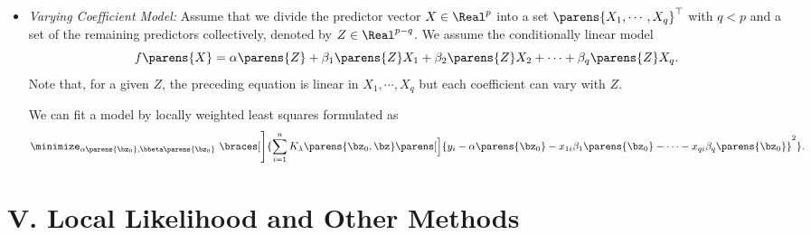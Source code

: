 \documentclass[12pt]{article}
\begin{document}
\begin{enumerate}[label=\textbf{\arabic*.}]
\begin{itemize}
		\item \textit{Varying Coefficient Model:} Assume that we divide the predictor vector $X \in \Real^p$ into a set $\parens{X_1, \cdots, X_q}^\top$ with $ q < p $ and a set of the remaining predictors collectively, denoted by $Z \in \Real^{p-q}$. We assume the conditionally linear model 
		\begin{equation*}
			f \parens{X} = \alpha \parens{Z} + \beta_1 \parens{Z} X_1 + \beta_2 \parens{Z} X_2 + \cdots + \beta_q \parens{Z} X_q. 
		\end{equation*}
		Note that, for a given $Z$, the preceding equation is linear in $X_1, \cdots, X_q$ but each coefficient can vary with $Z$. 
		
		We can fit a model by locally weighted least squares formulated as 
		\begin{align*}
			\minimize_{\alpha \parens{\bz_0}, \bbeta \parens{\bz_0}} \ \braces[\Bigg]{\sum_{i=1}^n K_\lambda \parens{\bz_0, \bz} \parens[\Big]{y_i - \alpha \parens{\bz_0} - x_{1i} \beta_1 \parens{\bz_0} - \cdots - x_{qi} \beta_q \parens{\bz_0}}^2}. 
		\end{align*}
	\end{itemize}

\end{enumerate}


\section*{V. Local Likelihood and Other Methods}
\end{document}
